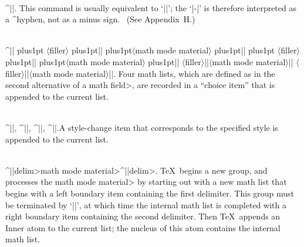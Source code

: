 \\^|\-|.\enskip
This command is usually equivalent to `|\discretionary{-}{}{}|';
the `|-|' is therefore interpreted as a ^{hyphen}, not as a minus sign.
\ (See Appendix~H.)

\def\s{\hskip0pt plus1pt}
\\^|\mathchoice|\s
$\langle$filler$\rangle$\s|{|\s$\langle$math mode material$\rangle$\s|}|\s
$\langle$filler$\rangle$\s|{|\s$\langle$math mode material$\rangle$\s|}|\break
$\langle$filler$\rangle$|{|$\langle$math mode material$\rangle$|}|
$\langle$filler$\rangle$|{|$\langle$math mode material$\rangle$|}|.
Four math lists, which are defined as in the
second alternative of a \<math field>, are
recorded in a ``choice item'' that is appended to the current list.

\\^|\displaystyle|, ^|\textstyle|, ^|\scriptstyle|,
^|\scriptscriptstyle|.\enskip A style-change item that corresponds to the
specified style is appended to the current list.

\\^|\left|\<delim>\<math mode material>^|\right|\<delim>.\enskip
\TeX\ begins a new group, and processes the \<math mode material>
by starting out with a new math list that begins with a left boundary
item containing the first delimiter. This group must be terminated by
`|\right|', at which time the internal math list is completed with a
right boundary item containing the second delimiter. Then \TeX\
appends an Inner atom to the current list; the nucleus of this atom
contains the internal math list.


